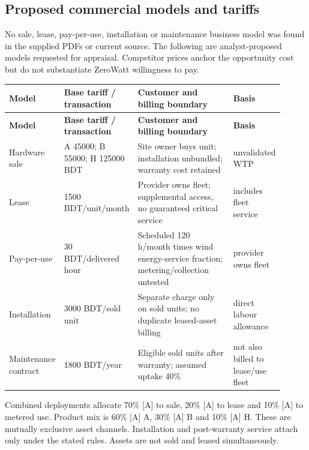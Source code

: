 \documentclass[11pt,a4paper]{article}
\begin{document}
\subsection{Proposed commercial models and tariffs}
No sale, lease, pay-per-use, installation or maintenance business model was found in the supplied PDFs or current source. The following are analyst-proposed models requested for appraisal. Competitor prices anchor the opportunity cost but do not substantiate ZeroWatt willingness to pay. \cite{project,poster,site,fanweb,aerator1}

{\small
\setlength{\tabcolsep}{3pt}\renewcommand{\arraystretch}{1.18}
\begin{longtable}{@{}>{\raggedright\arraybackslash}p{0.1487\linewidth}>{\raggedright\arraybackslash}p{0.2450\linewidth}>{\raggedright\arraybackslash}p{0.3937\linewidth}>{\raggedright\arraybackslash}p{0.1225\linewidth}@{}}
\toprule \textbf{Model} & \textbf{Base tariff / transaction} & \textbf{Customer and billing boundary} & \textbf{Basis} \\ \midrule
\endfirsthead\toprule \textbf{Model} & \textbf{Base tariff / transaction} & \textbf{Customer and billing boundary} & \textbf{Basis} \\ \midrule
\endhead\bottomrule\endfoot
Hardware sale & A \num{45000}; B \num{55000}; H \num{125000} BDT & Site owner buys unit; installation unbundled; warranty cost retained & [A] unvalidated WTP \\
Lease & \num{1500} BDT/unit/month & Provider owns fleet; supplemental access, no guaranteed critical service & [A] includes fleet service \\
Pay-per-use & \num{30} BDT/delivered hour & Scheduled \num{120} h/month times wind energy-service fraction; metering/collection untested & [A] provider owns fleet \\
Installation & \num{3000} BDT/sold unit & Separate charge only on sold units; no duplicate leased-asset billing & [A] direct labour allowance \\
Maintenance contract & \num{1800} BDT/year & Eligible sold units after warranty; assumed uptake \num{40}\% & [A] not also billed to lease/use fleet \\
\end{longtable}}
Combined deployments allocate \num{70}\% [A] to sale, \num{20}\% [A] to lease and \num{10}\% [A] to metered use. Product mix is \num{60}\% [A] A, \num{30}\% [A] B and \num{10}\% [A] H. These are mutually exclusive asset channels. Installation and post-warranty service attach only under the stated rules. Assets are not sold and leased simultaneously.
\end{document}
